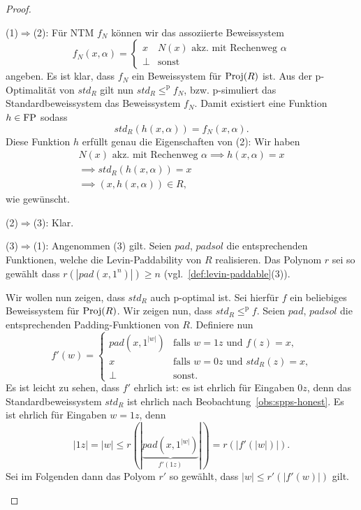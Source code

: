 \begin{proof}
\begin{prooflist}[label={}]
\item (1)$\Rightarrow$(2): Für NTM $f_N$ können wir das assoziierte Beweissystem
    \[ f_N(x, \alpha) = \begin{cases} x & \text{$N(x)$ akz. mit Rechenweg $\alpha$} \\ \bot & \text{sonst} \end{cases} \]
    angeben. Es ist klar, dass $f_N$ ein Beweissystem für $\operatorname{Proj}(R)$ ist.
    Aus der p-Optimalität von $\mathit{std}_R$ gilt nun $\mathit{std}_R\leq^\mathrm p f_N$, bzw. p-simuliert das Standardbeweissystem das Beweissystem $f_N$. Damit existiert eine Funktion $h\in\mathrm{FP}$ sodass
    \[ \mathit{std}_R(h(x, \alpha)) = f_N(x, \alpha). \]
    Diese Funktion $h$ erfüllt genau die Eigenschaften von (2): 
    Wir haben
    \begin{gather*}
        N(x) \text{ akz. mit Rechenweg $\alpha$} \implies h(x, \alpha)=x\\
        \implies \mathit{std}_R(h(x, \alpha)) = x\\
        \implies (x, h(x, \alpha))\in R,
    \end{gather*}
    wie gewünscht.

\item (2)$\Rightarrow$(3): Klar.

\item (3)$\Rightarrow$(1): Angenommen (3) gilt. 
    Seien $\mathit{pad}$, $\mathit{padsol}$ die entsprechenden Funktionen, welche die Levin-Paddability von $R$ realisieren. Das Polynom $r$ sei so gewählt dass $r(|\mathit{pad}(x, 1^n)|)\geq n$ (vgl.~\ref{def:levin-paddable}(3)).

    Wir wollen nun zeigen, dass $\mathit{std}_R$ auch p-optimal ist. Sei hierfür $f$ ein beliebiges Beweissystem für $\operatorname{Proj}(R)$. Wir zeigen nun, dass $\mathit{std}_R \leq^\mathrm p f$. Seien $\mathit{pad}$, $\mathit{padsol}$ die entsprechenden Padding-Funktionen von $R$.
    Definiere nun
    \[ f'(w) = \begin{cases} \mathit{pad}(x, 1^{|w|}) & \text{falls $w=1z$ und $f(z) = x$,} \\
    x & \text{falls $w=0z$ und $\mathit{std}_R(z)=x$,} \\ \bot & \text{sonst.} \end{cases} \]
    Es ist leicht zu sehen, dass $f'$ ehrlich ist: es ist ehrlich für Eingaben $0z$, denn das Standardbeweissystem $\mathit{std}_R$ ist ehrlich nach Beobachtung~\ref{obs:spps-honest}. Es ist ehrlich für Eingaben $w=1z$, denn
    \[ |1z| = |w| \leq r(|\underbrace{\mathit{pad}(x, 1^{|w|})}_{f'(1z)}|) = r(|f'(|w|)|). \]
    Sei im Folgenden dann das Polyom $r'$ so gewählt, dass $|w|\leq r'(|f'(w)|)$ gilt.


\end{prooflist}
\end{proof}
